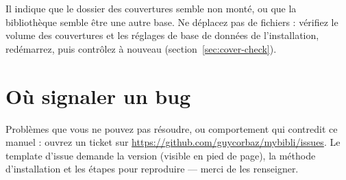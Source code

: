 Il indique que le dossier des couvertures semble non monté, ou que la
bibliothèque semble être une autre base. Ne déplacez pas de fichiers :
vérifiez le volume des couvertures et les réglages de base de données de
l'installation, redémarrez, puis contrôlez à nouveau
(section~\ref{sec:cover-check}).

\section{Où signaler un bug}

Problèmes que vous ne pouvez pas résoudre, ou comportement qui
contredit ce manuel : ouvrez un ticket sur
\url{https://github.com/guycorbaz/mybibli/issues}. Le template
d'issue demande la version (visible en pied de page), la méthode
d'installation et les étapes pour reproduire — merci de les
renseigner.
